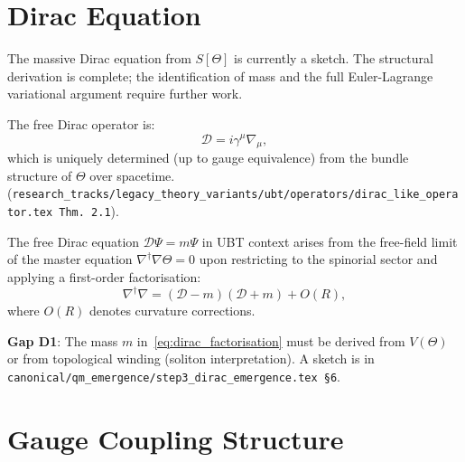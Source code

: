 \documentclass[11pt,a4paper]{article}
\theoremstyle{definition}
\theoremstyle{remark}
\begin{document}
\section{Dirac Equation}\label{sec:dirac}

\begin{tcolorbox}[colback=yellow!8!white,colframe=orange!60!black,title=Current status: Sketch]
The massive Dirac equation from $S[\Theta]$ is currently a sketch.
The structural derivation is complete; the identification of mass and the
full Euler-Lagrange variational argument require further work.
\end{tcolorbox}

The free Dirac operator is:
\begin{equation}\label{eq:Dirac_op}
  \mathcal{D} = i\gamma^\mu\nabla_\mu,
\end{equation}
which is uniquely determined (up to gauge equivalence) from the bundle structure
of $\Theta$ over spacetime.
(\texttt{research\_tracks/legacy\_theory\_variants/ubt/operators/dirac\_like\_operator.tex Thm.~2.1}).

The free Dirac equation $\mathcal{D}\Psi = m\Psi$ in UBT context arises from the
free-field limit of the master equation $\nabla^\dagger\nabla\Theta = 0$ upon
restricting to the spinorial sector and applying a first-order factorisation:
\begin{equation}\label{eq:dirac_factorisation}
  \nabla^\dagger\nabla = (\mathcal{D} - m)(\mathcal{D} + m) + O(R),
\end{equation}
where $O(R)$ denotes curvature corrections.

\begin{tcolorbox}[colback=yellow!8!white,colframe=orange!60!black,title=Open gap: mass identification]
\textbf{Gap D1}: The mass $m$ in~\eqref{eq:dirac_factorisation} must be derived
from $V(\Theta)$ or from topological winding (soliton interpretation).
A sketch is in \texttt{canonical/qm\_emergence/step3\_dirac\_emergence.tex \S6}.
\end{tcolorbox}

\section{Gauge Coupling Structure}\label{sec:coupling}
\end{document}
